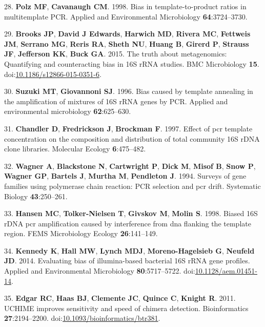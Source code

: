 \documentclass[11pt,]{article}
\begin{document}
\leavevmode\hypertarget{ref-Polz1998}{}%
28. \textbf{Polz MF}, \textbf{Cavanaugh CM}. 1998. Bias in
template-to-product ratios in multitemplate PCR. Applied and
Environmental Microbiology \textbf{64}:3724--3730.

\leavevmode\hypertarget{ref-Brooks2015}{}%
29. \textbf{Brooks JP}, \textbf{David J Edwards}, \textbf{Harwich MD},
\textbf{Rivera MC}, \textbf{Fettweis JM}, \textbf{Serrano MG},
\textbf{Reris RA}, \textbf{Sheth NU}, \textbf{Huang B}, \textbf{Girerd
P}, \textbf{Strauss JF}, \textbf{Jefferson KK}, \textbf{Buck GA}. 2015.
The truth about metagenomics: Quantifying and counteracting bias in 16S
rRNA studies. BMC Microbiology \textbf{15}.
doi:\href{https://doi.org/10.1186/s12866-015-0351-6}{10.1186/s12866-015-0351-6}.

\leavevmode\hypertarget{ref-Suzuki1996}{}%
30. \textbf{Suzuki MT}, \textbf{Giovannoni SJ}. 1996. Bias caused by
template annealing in the amplification of mixtures of 16S rRNA genes by
PCR. Applied and environmental microbiology \textbf{62}:625--630.

\leavevmode\hypertarget{ref-Chandler1997}{}%
31. \textbf{Chandler D}, \textbf{Fredrickson J}, \textbf{Brockman F}.
1997. Effect of pcr template concentration on the composition and
distribution of total community 16S rDNA clone libraries. Molecular
Ecology \textbf{6}:475--482.

\leavevmode\hypertarget{ref-Wagner1994}{}%
32. \textbf{Wagner A}, \textbf{Blackstone N}, \textbf{Cartwright P},
\textbf{Dick M}, \textbf{Misof B}, \textbf{Snow P}, \textbf{Wagner GP},
\textbf{Bartels J}, \textbf{Murtha M}, \textbf{Pendleton J}. 1994.
Surveys of gene families using polymerase chain reaction: PCR selection
and pcr drift. Systematic Biology \textbf{43}:250--261.

\leavevmode\hypertarget{ref-Hansen1998}{}%
33. \textbf{Hansen MC}, \textbf{Tolker-Nielsen T}, \textbf{Givskov M},
\textbf{Molin S}. 1998. Biased 16S rDNA pcr amplification caused by
interference from dna flanking the template region. FEMS Microbiology
Ecology \textbf{26}:141--149.

\leavevmode\hypertarget{ref-Kennedy2014}{}%
34. \textbf{Kennedy K}, \textbf{Hall MW}, \textbf{Lynch MDJ},
\textbf{Moreno-Hagelsieb G}, \textbf{Neufeld JD}. 2014. Evaluating bias
of illumina-based bacterial 16S rRNA gene profiles. Applied and
Environmental Microbiology \textbf{80}:5717--5722.
doi:\href{https://doi.org/10.1128/aem.01451-14}{10.1128/aem.01451-14}.

\leavevmode\hypertarget{ref-Edgar2011}{}%
35. \textbf{Edgar RC}, \textbf{Haas BJ}, \textbf{Clemente JC},
\textbf{Quince C}, \textbf{Knight R}. 2011. UCHIME improves sensitivity
and speed of chimera detection. Bioinformatics \textbf{27}:2194--2200.
doi:\href{https://doi.org/10.1093/bioinformatics/btr381}{10.1093/bioinformatics/btr381}.
\end{document}
